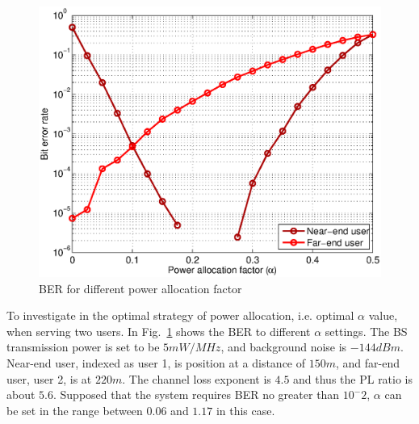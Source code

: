 \begin{figure}[t]
\begin{center}
\includegraphics[width=0.95\columnwidth ,angle=0]{figure/alphaVSber.eps}
\caption{BER for different power allocation factor}
\label{fig_sim_aVSber}
\end{center}
\end{figure}
To investigate in the optimal strategy of power allocation, i.e. optimal $\alpha$
value, when serving two users.
In Fig.~\ref{fig_sim_aVSber} shows the BER to different $\alpha$ settings.
The BS transmission power is set to be $5mW/MHz$, and background noise is $-144dBm$.
Near-end user, indexed as user 1, is position at a distance of $150m$, and far-end
user, user 2, is at $220m$.
The channel loss exponent is $4.5$ and thus the PL ratio is about $5.6$.
Supposed that the system requires BER no greater than $10^-2$, $\alpha$
can be set in the range between $0.06$ and $1.17$ in this case.